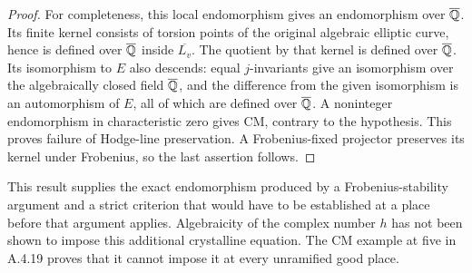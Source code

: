 \begin{proof}
For completeness, this local endomorphism gives an endomorphism over $\overline{\mathbb Q}$. Its finite kernel consists of torsion points of the original algebraic elliptic curve, hence is defined over $\overline{\mathbb Q}$ inside $\overline{L_v}$. The quotient by that kernel is defined over $\overline{\mathbb Q}$. Its isomorphism to $E$ also descends: equal $j$-invariants give an isomorphism over the algebraically closed field $\overline{\mathbb Q}$, and the difference from the given isomorphism is an automorphism of $E$, all of which are defined over $\overline{\mathbb Q}$. A noninteger endomorphism in characteristic zero gives CM, contrary to the hypothesis. This proves failure of Hodge-line preservation. A Frobenius-fixed projector preserves its kernel under Frobenius, so the last assertion follows.
\end{proof}

This result supplies the exact endomorphism produced by a Frobenius-stability argument and a strict criterion that would have to be established at a place before that argument applies. Algebraicity of the complex number $h$ has not been shown to impose this additional crystalline equation. The CM example at five in A.4.19 proves that it cannot impose it at every unramified good place.


